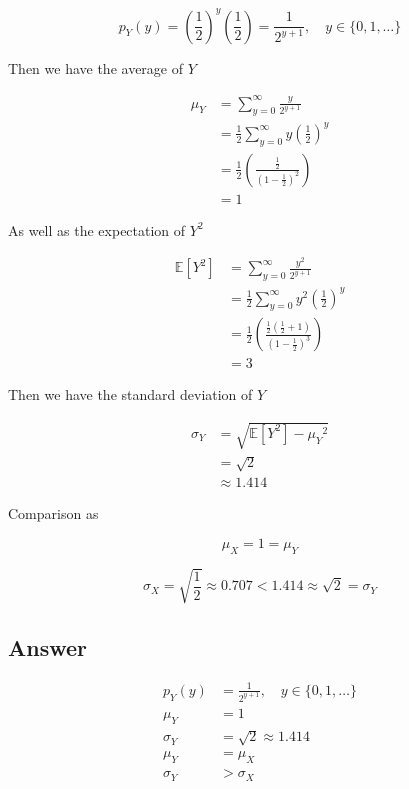 \documentclass[12pt]{article}
\newcommand{\bE}{\mathbb{E}}
\begin{document}
\begin{enumerate}[start=1,label={\bfseries Part \arabic*:},leftmargin=0in]
			\[
				p_Y(y) = \left(\frac{1}{2}\right)^y\left(\frac{1}{2}\right) = \frac{1}{2^{y+1}},\quad y\in\{0,1,\dots\}
			\]
			
			Then we have the average of $Y$
			
			\[
				\begin{aligned}
					\mu_Y &= \sum_{y = 0}^{\infty}\frac{y}{2^{y+1}}\\
					&= \frac{1}{2}\sum_{y=0}^{\infty}y\left(\frac{1}{2}\right)^y\\
					&= \frac{1}{2}\left(\frac{\frac{1}{2}}{\left(1-\frac{1}{2}\right)^2}\right)\\
					&= 1
				\end{aligned}
			\]
			
			As well as the expectation of $Y^2$
			
			\[
				\begin{aligned}
					\bE\left[Y^2\right] &= \sum_{y=0}^{\infty}\frac{y^2}{2^{y+1}}\\
					&= \frac{1}{2}\sum_{y=0}^{\infty}y^2\left(\frac{1}{2}\right)^y\\
					&= \frac{1}{2}\left(\frac{\frac{1}{2}\left(\frac{1}{2}+1\right)}{\left(1-\frac{1}{2}\right)^3}\right)\\
					&= 3
				\end{aligned}
			\]
			
			Then we have the standard deviation of $Y$
			
			\[
				\begin{aligned}
					\sigma_Y &= \sqrt{\bE\left[Y^2\right] - {\mu_Y}^2}\\
					&= \sqrt{2}\\
					&\approx 1.414
				\end{aligned}
			\]
			
			Comparison as
			
			\[\mu_X = 1 = \mu_Y\]
			
			\[\sigma_X = \sqrt{\frac{1}{2}} \approx 0.707 < 1.414 \approx \sqrt{2} = \sigma_Y\]
		
		\subsection*{Answer}
		
			\[\boxed{
				\begin{aligned}
					p_Y(y) &= \frac{1}{2^{y+1}},\quad y\in\{0,1,\dots\}\\
					\mu_Y &= 1\\
					\sigma_Y &= \sqrt{2} \approx 1.414\\
					\mu_Y &= \mu_X\\
					\sigma_Y &> \sigma_X
				\end{aligned}
			}\]
	\end{enumerate}
	
\end{document}
